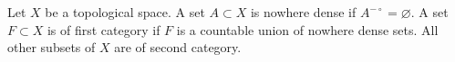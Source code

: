Let $X$ be a topological space. A set $A \subset X$ is nowhere dense if $A^{-\circ} = \varnothing$. A set $F \subset X$ is of first category if $F$ is a countable union of nowhere dense sets. All other subsets of $X$ are of second category.